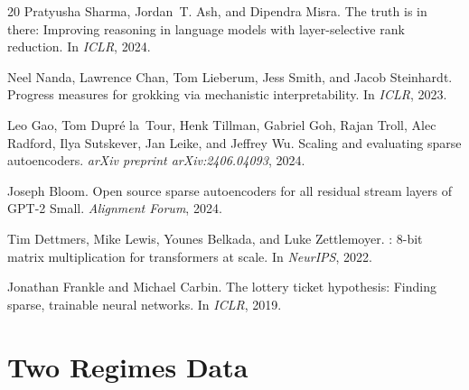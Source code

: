 \documentclass{article}
\begin{document}
\begin{thebibliography}{20}
Pratyusha Sharma, Jordan~T. Ash, and Dipendra Misra.
\newblock The truth is in there: Improving reasoning in language models with layer-selective rank
  reduction.
\newblock In \emph{ICLR}, 2024.

Neel Nanda, Lawrence Chan, Tom Lieberum, Jess Smith, and Jacob Steinhardt.
\newblock Progress measures for grokking via mechanistic interpretability.
\newblock In \emph{ICLR}, 2023.

Leo Gao, Tom Dupr\'{e} la~Tour, Henk Tillman, Gabriel Goh, Rajan Troll, Alec Radford,
  Ilya Sutskever, Jan Leike, and Jeffrey Wu.
\newblock Scaling and evaluating sparse autoencoders.
\newblock \emph{arXiv preprint arXiv:2406.04093}, 2024.

Joseph Bloom.
\newblock Open source sparse autoencoders for all residual stream layers of {GPT-2} {S}mall.
\newblock \emph{Alignment Forum}, 2024.

Tim Dettmers, Mike Lewis, Younes Belkada, and Luke Zettlemoyer.
: 8-bit matrix multiplication for transformers at scale.
\newblock In \emph{NeurIPS}, 2022.

Jonathan Frankle and Michael Carbin.
\newblock The lottery ticket hypothesis: Finding sparse, trainable neural networks.
\newblock In \emph{ICLR}, 2019.

\end{thebibliography}

\appendix
\section{Two Regimes Data}
\label{app:tworegimes}
\end{document}
